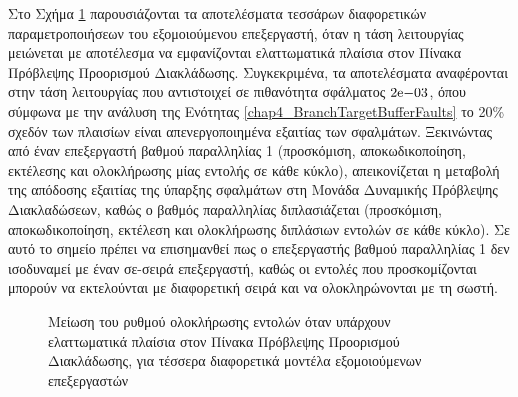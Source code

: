 Στο Σχήμα \ref{fig:chap4_core_config_performance} παρουσιάζονται τα αποτελέσματα τεσσάρων διαφορετικών παραμετροποιήσεων του εξομοιούμενου επεξεργαστή, όταν η τάση λειτουργίας μειώνεται με αποτέλεσμα να εμφανίζονται ελαττωματικά πλαίσια στον Πίνακα Πρόβλεψης Προορισμού Διακλάδωσης. Συγκεκριμένα, τα αποτελέσματα αναφέρονται στην τάση λειτουργίας που αντιστοιχεί σε πιθανότητα σφάλματος $2\mathrm{e}{-03}$, όπου σύμφωνα με την ανάλυση της Ενότητας \ref{chap4_BranchTargetBufferFaults} το 20\% σχεδόν των πλαισίων είναι απενεργοποιημένα εξαιτίας των σφαλμάτων. Ξεκινώντας από έναν επεξεργαστή βαθμού παραλληλίας 1 (προσκόμιση, αποκωδικοποίηση, εκτέλεσης και ολοκλήρωσης μίας εντολής σε κάθε κύκλο), απεικονίζεται η μεταβολή της απόδοσης εξαιτίας της ύπαρξης σφαλμάτων στη Μονάδα Δυναμικής Πρόβλεψης Διακλαδώσεων, καθώς ο βαθμός παραλληλίας διπλασιάζεται (προσκόμιση, αποκωδικοποίηση, εκτέλεση και ολοκλήρωσης διπλάσιων εντολών σε κάθε κύκλο). Σε αυτό το σημείο πρέπει να επισημανθεί πως ο επεξεργαστής βαθμού παραλληλίας 1 δεν ισοδυναμεί με έναν σε-σειρά επεξεργαστή, καθώς οι εντολές που προσκομίζονται μπορούν να εκτελούνται με διαφορετική σειρά και να ολοκληρώνονται με τη σωστή.

\begin{figure}[t]
    \centering
    \caption{Μείωση του ρυθμού ολοκλήρωσης εντολών όταν υπάρχουν ελαττωματικά πλαίσια στον Πίνακα Πρόβλεψης Προορισμού Διακλάδωσης, για τέσσερα διαφορετικά μοντέλα εξομοιούμενων επεξεργαστών}
    \label{fig:chap4_core_config_performance}
\end{figure}

